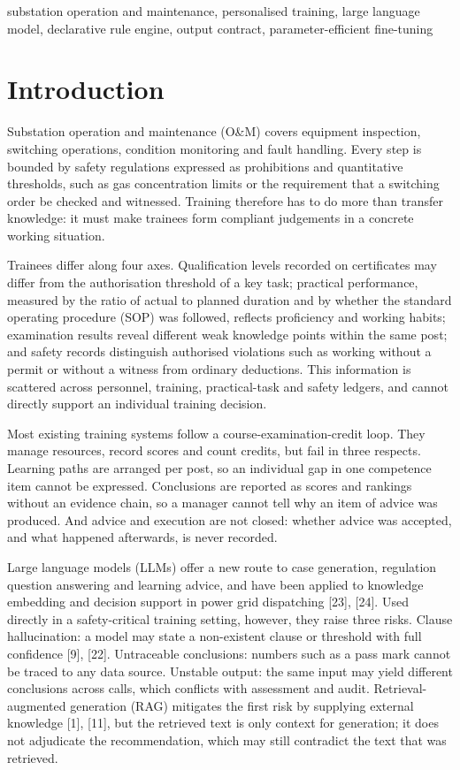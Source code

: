 \documentclass[conference]{IEEEtran}
\begin{document}
\begin{IEEEkeywords}
substation operation and maintenance, personalised training, large language model, declarative rule engine, output contract, parameter-efficient fine-tuning
\end{IEEEkeywords}
\section{Introduction}

Substation operation and maintenance (O\&M) covers equipment inspection, switching operations, condition monitoring and fault handling. Every step is bounded by safety regulations expressed as prohibitions and quantitative thresholds, such as gas concentration limits or the requirement that a switching order be checked and witnessed. Training therefore has to do more than transfer knowledge: it must make trainees form compliant judgements in a concrete working situation.


Trainees differ along four axes. Qualification levels recorded on certificates may differ from the authorisation threshold of a key task; practical performance, measured by the ratio of actual to planned duration and by whether the standard operating procedure (SOP) was followed, reflects proficiency and working habits; examination results reveal different weak knowledge points within the same post; and safety records distinguish authorised violations such as working without a permit or without a witness from ordinary deductions. This information is scattered across personnel, training, practical-task and safety ledgers, and cannot directly support an individual training decision.


Most existing training systems follow a course-examination-credit loop. They manage resources, record scores and count credits, but fail in three respects. Learning paths are arranged per post, so an individual gap in one competence item cannot be expressed. Conclusions are reported as scores and rankings without an evidence chain, so a manager cannot tell why an item of advice was produced. And advice and execution are not closed: whether advice was accepted, and what happened afterwards, is never recorded.


Large language models (LLMs) offer a new route to case generation, regulation question answering and learning advice, and have been applied to knowledge embedding and decision support in power grid dispatching [23], [24]. Used directly in a safety-critical training setting, however, they raise three risks. Clause hallucination: a model may state a non-existent clause or threshold with full confidence [9], [22]. Untraceable conclusions: numbers such as a pass mark cannot be traced to any data source. Unstable output: the same input may yield different conclusions across calls, which conflicts with assessment and audit. Retrieval-augmented generation (RAG) mitigates the first risk by supplying external knowledge [1], [11], but the retrieved text is only context for generation; it does not adjudicate the recommendation, which may still contradict the text that was retrieved.
\end{document}

